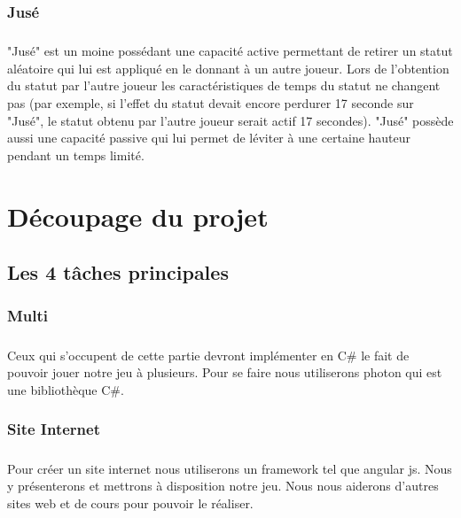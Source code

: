 \documentclass[12pt]{report}
\begin{document}
		\subsection{Jusé}
		\paragraph{}
			"Jusé" est un moine possédant une capacité active permettant de retirer un statut aléatoire qui lui est appliqué en le donnant à un autre joueur. Lors de l'obtention du statut par l'autre joueur les caractéristiques de temps du statut ne changent pas (par exemple, si l'effet du statut devait encore perdurer 17 seconde sur "Jusé", le statut obtenu par l'autre joueur serait actif 17 secondes).  "Jusé" possède aussi une capacité passive qui lui permet de léviter à une certaine hauteur pendant un temps limité.
					
\chapter{Découpage du projet} %

	\section{Les 4 tâches principales}
	
		\subsection{Multi}
		\paragraph{}
Ceux qui s'occupent de cette partie devront implémenter en C\# le 
fait de pouvoir jouer notre jeu à plusieurs. Pour se faire nous
utiliserons photon qui est une bibliothèque C\#. 

		\subsection{Site Internet}
		\paragraph{}
Pour créer un site internet nous utiliserons un framework tel que angular js. Nous y présenterons et mettrons à
disposition notre jeu. Nous nous aiderons d'autres sites web et de cours pour pouvoir le réaliser.
\end{document}
